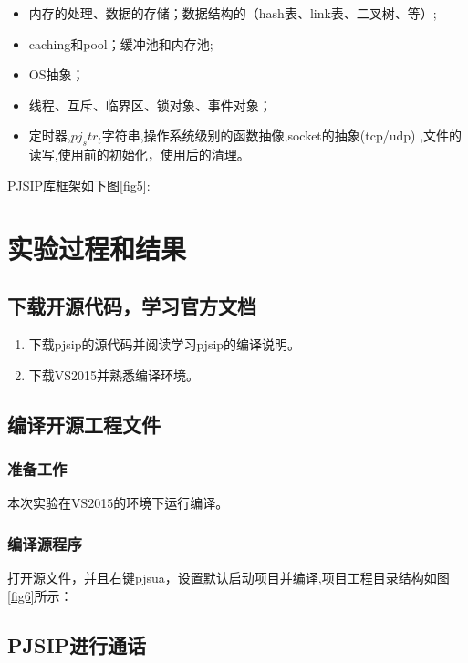 \documentclass[a4paper,AutoFakeBold,oneside,12pt]{book}
\begin{document}
\begin{itemize}
\item 内存的处理、数据的存储；数据结构的（hash表、link表、二叉树、等）;
\item caching和pool；缓冲池和内存池;
\item OS抽象；
\item 线程、互斥、临界区、锁对象、事件对象；
\item 定时器,$pj_str_t$字符串,操作系统级别的函数抽像,socket的抽象(tcp/udp) ,文件的读写,使用前的初始化，使用后的清理。
\end{itemize}

PJSIP库框架如下图\ref{fig5}:


\chapter{实验过程和结果}
\section{下载开源代码，学习官方文档}

\begin{enumerate}
\item 下载pjsip的源代码并阅读学习pjsip的编译说明。
\item 下载VS2015并熟悉编译环境。
\end{enumerate}

\section{编译开源工程文件}
\subsection{准备工作}
本次实验在VS2015的环境下运行编译。

\subsection{编译源程序}
打开源文件，并且右键pjsua，设置默认启动项目并编译,项目工程目录结构如图\ref{fig6}所示：


\section{PJSIP进行通话}
\end{document}
